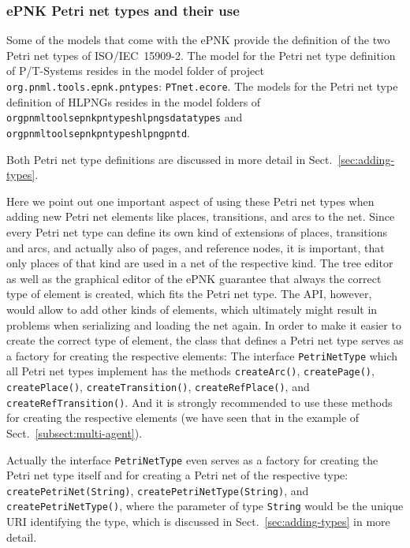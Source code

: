 \subsubsection{ePNK Petri net types and their use}
\label{subsubsec:function:PNTD:use}

Some of the models that come with the ePNK provide the definition of the
two Petri net types of ISO/IEC~15909-2. The model for the Petri net type
definition of P/T-Systems resides in the model folder of
project {\tt org.pnml.tools.epnk.pntypes}: {\tt PTnet.ecore}.
The models for the Petri net type definition of HLPNGs resides in the
model folders of
{\tt org\qnsep{}pnml\qnsep{}tools\qnsep{}epnk\qnsep{}pntypes\qnsep{}hlpngs\qnsep{}datatypes} 
and {\tt org\qnsep{}pnml\qnsep{}tools\qnsep{}epnk\qnsep{}pntypes\qnsep{}hlpng\qnsep{}pntd}.

Both Petri net type definitions are discussed in more detail
in Sect.~\ref{sec:adding-types}.

Here we point out one important aspect of using these Petri net types
when adding new Petri net elements like places, transitions, and arcs
to the net. Since every Petri net type can define its own kind of
extensions of places, transitions and arcs, and actually also of
pages, and reference nodes, it is important, that only places of
that kind are used in a net of the respective kind. The tree editor as
well as the graphical editor of the ePNK guarantee that always the
correct type of element is created, which fits the Petri net type.
The API, however, would allow to add other kinds of elements,
which ultimately might result in problems when serializing and
loading the net again. In order to make it easier to create the
correct type of element, the class that defines a Petri net type
serves as a factory for creating the respective elements: The
interface {\tt PetriNetType} which all Petri net types implement
has the methods {\tt createArc()},  {\tt createPage()},  {\tt createPlace()},
 {\tt createTransition()},  {\tt createRefPlace()}, and  {\tt createRefTransition()}.
And it is strongly recommended to use these methods for creating
the respective elements (we have seen that in the example of
Sect.~\ref{subsect:multi-agent}).

Actually the interface {\tt PetriNetType} even serves as a factory for creating
the Petri net type itself and for creating a Petri net of the respective type:
{\tt createPetriNet(String)},  {\tt createPetriNetType(String)}, and
{\tt createPetriNetType()}, where the parameter of type {\tt String} would be
the unique URI identifying the type,%
which is discussed in Sect.~\ref{sec:adding-types} in more detail.  
  
